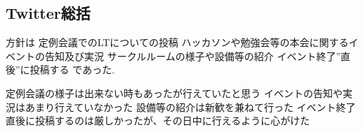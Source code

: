 \subsection*{Twitter総括}

方針は
    定例会議でのLTについての投稿
    ハッカソンや勉強会等の本会に関するイベントの告知及び実況
    サークルルームの様子や設備等の紹介
    イベント終了”直後”に投稿する
であった.

定例会議の様子は出来ない時もあったが行えていたと思う
イベントの告知や実況はあまり行えていなかった
設備等の紹介は新歓を兼ねて行った
イベント終了直後に投稿するのは厳しかったが、その日中に行えるように心がけた
